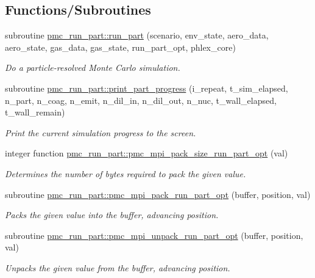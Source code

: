 \subsection*{Functions/\+Subroutines}
\begin{DoxyCompactItemize}
\item 
subroutine \mbox{\hyperlink{namespacepmc__run__part_af2f5c765b1f86663d85b7ca882325eca}{pmc\+\_\+run\+\_\+part\+::run\+\_\+part}} (scenario, env\+\_\+state, aero\+\_\+data, aero\+\_\+state, gas\+\_\+data, gas\+\_\+state, run\+\_\+part\+\_\+opt, phlex\+\_\+core)
\begin{DoxyCompactList}\small\item\em Do a particle-\/resolved Monte Carlo simulation. \end{DoxyCompactList}\item 
subroutine \mbox{\hyperlink{namespacepmc__run__part_a78a61c036c01bfc2a51ef82319cfa1ef}{pmc\+\_\+run\+\_\+part\+::print\+\_\+part\+\_\+progress}} (i\+\_\+repeat, t\+\_\+sim\+\_\+elapsed, n\+\_\+part, n\+\_\+coag, n\+\_\+emit, n\+\_\+dil\+\_\+in, n\+\_\+dil\+\_\+out, n\+\_\+nuc, t\+\_\+wall\+\_\+elapsed, t\+\_\+wall\+\_\+remain)
\begin{DoxyCompactList}\small\item\em Print the current simulation progress to the screen. \end{DoxyCompactList}\item 
integer function \mbox{\hyperlink{namespacepmc__run__part_ae9658ba7f39866fd66db89befeb7e24d}{pmc\+\_\+run\+\_\+part\+::pmc\+\_\+mpi\+\_\+pack\+\_\+size\+\_\+run\+\_\+part\+\_\+opt}} (val)
\begin{DoxyCompactList}\small\item\em Determines the number of bytes required to pack the given value. \end{DoxyCompactList}\item 
subroutine \mbox{\hyperlink{namespacepmc__run__part_ab2ea939c65074559a8e6f98626ec07b7}{pmc\+\_\+run\+\_\+part\+::pmc\+\_\+mpi\+\_\+pack\+\_\+run\+\_\+part\+\_\+opt}} (buffer, position, val)
\begin{DoxyCompactList}\small\item\em Packs the given value into the buffer, advancing position. \end{DoxyCompactList}\item 
subroutine \mbox{\hyperlink{namespacepmc__run__part_ab6674f0051ea8191191000e82158faa1}{pmc\+\_\+run\+\_\+part\+::pmc\+\_\+mpi\+\_\+unpack\+\_\+run\+\_\+part\+\_\+opt}} (buffer, position, val)
\begin{DoxyCompactList}\small\item\em Unpacks the given value from the buffer, advancing position. \end{DoxyCompactList}\end{DoxyCompactItemize}
